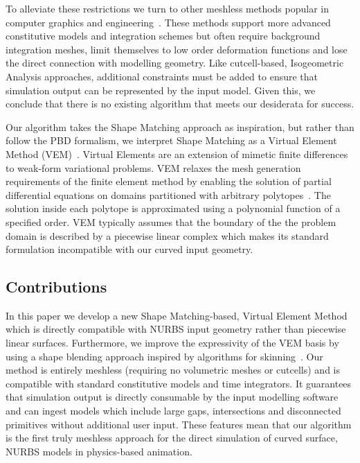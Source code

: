 To alleviate these restrictions we turn to other meshless methods popular in computer graphics and 
engineering~\cite{10.1145/1028523.1028542,https://doi.org/10.1002/fld.1650200824,10.1145/1778765.1778776,10.1145/2010324.1964968, 10.1145/1944846.1944855}.
These methods support more advanced constitutive models and integration schemes but often require background integration meshes, limit themselves to low order deformation functions 
and lose the direct connection with
modelling geometry. 
Like cutcell-based, Isogeometric Analysis approaches, additional constraints must be added to ensure that simulation output can be represented by the input model.
Given this, we conclude that there is no existing algorithm that meets our desiderata for success. 

Our algorithm takes the Shape Matching approach as inspiration, but rather than follow the PBD formalism, we interpret Shape Matching as a 
Virtual Element Method (VEM)~\cite{10.1142/S0218202512500492,10.1142/S021820251440003X}. Virtual Elements are an extension of 
mimetic finite differences~\cite{10.1142/S0218202505000832,10.1016/j.jcp.2013.07.031} to weak-form variational problems. 
VEM relaxes the mesh generation requirements of the finite element method by enabling the solution of partial differential equations
on domains partitioned with arbitrary polytopes~\cite{10.1145/3386569.3392389}. 
The solution inside each polytope is approximated using a polynomial function of a specified order.
VEM typically assumes that the boundary of the the problem domain is described by a piecewise linear complex
which makes its standard formulation incompatible with our curved input geometry. 


\subsection*{Contributions} 
In this paper we develop a new Shape Matching-based, Virtual Element Method which is directly compatible 
with NURBS input geometry rather than piecewise linear surfaces. 
Furthermore, we improve the expressivity of the VEM basis by using a shape blending approach inspired by
algorithms for skinning~\cite{skinningcourse:2014}.
Our method is entirely meshless (requiring no volumetric meshes or cutcells) and is compatible with standard constitutive models and time integrators.
It guarantees that simulation output is directly consumable by the input modelling software and can ingest models which include large gaps,
intersections and disconnected primitives without additional user input. 
These features mean that our algorithm is the first truly meshless approach for the direct simulation of curved surface, NURBS models in physics-based animation.

